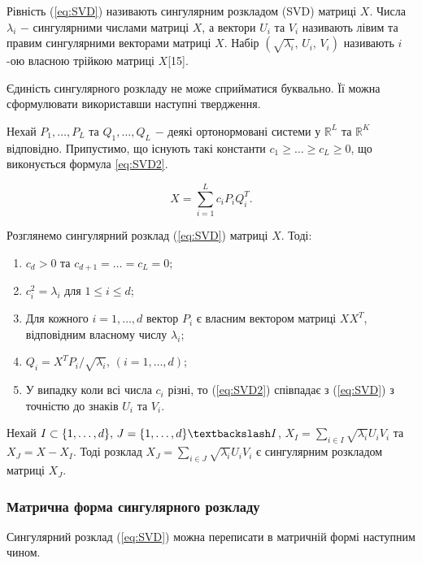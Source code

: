 Рівність (\ref{eq:SVD}) називають сингулярним розкладом (SVD) матриці $X$. Числа $\lambda_{i}$ $-$ сингулярними числами матриці $X$, а вектори $U_{i}$ та $V_{i}$ називають лівим та правим сингулярними векторами матриці $X$. Набір $(\sqrt{\lambda_{i}}, \, U_{i}, \, V_{i})$ називають $i$-ою власною трійкою матриці $X$[15].

Єдиність сингулярного розкладу не може сприйматися буквально. Її можна сформулювати використавши наступні твердження.

Нехай $P_{1}, \dots, P_{L}$ та $Q_{1}, \dots, Q_{L}$ $-$ деякі ортонормовані системи у $\mathds{R}^{L}$ та $\mathds{R}^{K}$ відповідно. Припустимо, що існують такі константи $c_{1} \ge \dots \ge c_{L} \ge 0$, що виконується формула \ref{eq:SVD2}.

\begin{equation}\label{eq:SVD2}
X = \sum_{i=1}^{L}c_{i}P_{i}Q_{i}^{T}.
\end{equation}

Розглянемо сингулярний розклад (\ref{eq:SVD}) матриці $X$. Тоді:

\begin{enumerate}
	\item $c_{d} > 0$ та $c_{d+1} = \dots = c_{L} = 0$;
	\item $c_{i}^{2} = \lambda_{i}$ для $1 \le i \le d$;
	\item Для кожного $i = 1, \dots, d$ вектор $P_{i}$ є власним вектором матриці $XX^{T}$, відповідним власному числу $\lambda_{i}$;
	\item $Q_{i} = X^{T}P_{i}/\sqrt{\lambda_{i}}, \, (i=1, \dots, d)$;
	\item У випадку коли всі числа $c_{i}$ різні, то (\ref{eq:SVD2}) співпадає з (\ref{eq:SVD}) з точністю до знаків $U_{i}$ та $V_{i}$.
\end{enumerate}

Нехай $I \subset \{1, \dots, d\}, \, J=\{1, \dots, d\} \textbackslash I$, $X_{I} = \sum_{i \in I}\sqrt{\lambda_{i}}U_{i}V_{i}$ та $X_{J} = X - X_{I}$. Тоді розклад $X_{J} = \sum_{i \in J}\sqrt{\lambda_{i}}U_{i}V_{i}$ є сингулярним розкладом матриці $X_{J}$.

\subsubsection{Матрична форма сингулярного розкладу}

Сингулярний розклад (\ref{eq:SVD}) можна переписати в матричній формі наступним чином.

